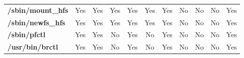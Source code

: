 \begin{center}
{\begin{tabular}{|>{\bfseries} l | C | C | C | C | C | C | C | C | C | C |}
					/sbin/mount\_hfs & Yes & Yes & Yes & Yes & Yes & Yes & No & No & \color{green}No & \color{red}Yes\\ 
					/sbin/newfs\_hfs & Yes & Yes & Yes & Yes & Yes & Yes & No & No & \color{green}No & \color{red}Yes\\ 
					/sbin/pfctl & Yes & Yes & \color{green}No & \color{red}Yes & \color{green}No & \color{red}Yes & No & No & \color{green}No & \color{red}Yes\\ 
					/usr/bin/brctl & Yes & Yes & \color{green}No & \color{red}Yes & \color{green}No & \color{red}Yes & No & No & \color{green}No & \color{red}Yes\\ 

			\end{tabular}
		}
	\end{center}



